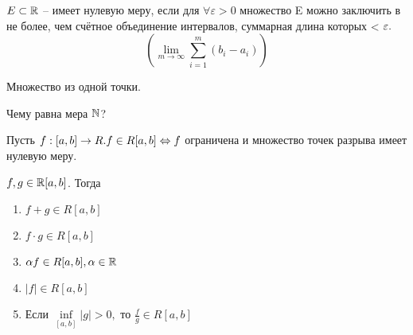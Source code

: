 \begin{Def} 
	$E \subset \mathbb{R}$ -- имеет нулевую меру, если для $\forall \varepsilon > 0$ множество E можно заключить в не более, чем счётное объединение интервалов, суммарная длина
	которых < $\displaystyle  \varepsilon.\\$ \[ \left(\lim_{m \to \infty} \sum_{i=1}^m (b_i-a_i)\right)\]
\end{Def} 

\begin{Example}
	Множество из одной точки.
\end{Example}

\begin{Ex}
	Чему равна мера $\mathbb{N}$?
\end{Ex}

\begin{Thm} 
	Пусть $f:[a, b] \to R. \\ f \in R[a,b] \Leftrightarrow f$ ограничена и множество точек разрыва имеет нулевую меру.
\end{Thm}

\begin{Thm} 
	$f, g \in \mathbb{R} [a,b]$. Тогда
	\begin{enumerate}
		\item $f+g \in R[a,b]$
		\item $f \cdot g \in R[a,b]$
		\item $\alpha f \in R[a,b], \alpha \in \mathbb{R}$
		\item $|f| \in R[a,b]$
		\item Если $\underset{[a,b]}{\inf} |g| > 0,$ то $\displaystyle \frac{f}{g} \in R[a,b]$
	\end{enumerate}
\end{Thm} 

